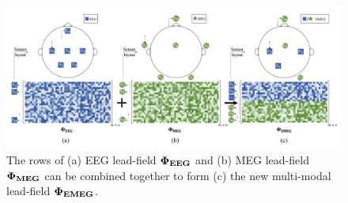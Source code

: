 \begin{figure}[!b]
\centering
\includegraphics[width=1\textwidth,keepaspectratio]{images/EMEG-LF.png} %
\centering
\caption{The rows of (a) EEG lead-field $\boldsymbol{\Phi}_{\boldsymbol{\mathrm{EEG}}}$ and (b) MEG lead-field $\boldsymbol{\Phi}_{\boldsymbol{\mathrm{MEG}}}$ can be combined together to form (c) the new multi-modal lead-field $\boldsymbol{\Phi}_{\boldsymbol{\mathrm{EMEG}}}$.}
\label{fig:EMEG-LF}
\end{figure}